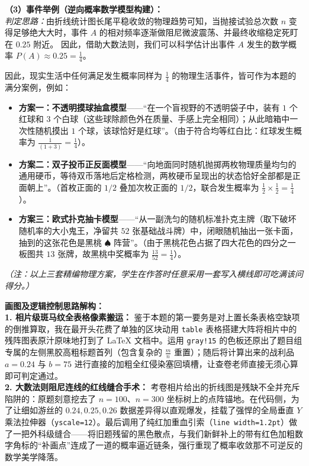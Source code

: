 \vspace{0.4cm}
\textbf{（3）事件举例（逆向概率数学模型构建）：} \\
\textit{判定思路：}由折线统计图长尾平稳收敛的物理趋势可知，当抛接试验总次数 $n$ 变得足够绝大大时，事件 $A$ 的相对频率逐渐做阻尼微波震荡、并最终收缩稳定死盯在 $0.25$ 附近。
因此，借助大数法则，我们可以科学估计出事件 $A$ 发生的数学概率 $P(A) \approx 0.25 = \frac{1}{4}$。

因此，现实生活中任何满足发生概率同样为 $\frac{1}{4}$ 的物理生活事件，皆可作为本题的满分案例，例如：
\begin{itemize}
    \item \textbf{方案一：不透明摸球抽盒模型}——“在一个盲视野的不透明袋子中，装有 $1$ 个红球和 $3$ 个白球（这些球除颜色外在质量、手感上完全相同）；从此暗箱中一次性随机摸出 $1$ 个球，该球恰好是红球”。（由于符合均等红白比：红球发生概率为 $\frac{1}{(1+3)} = \frac{1}{4}$）。
    \item \textbf{方案二：双子投币正反面模型}——“向地面同时随机抛掷两枚物理质量均匀的通用硬币，等待双币落地后定格检测，两枚硬币呈现出的状态恰好全部都是正面朝上”。（首枚正面的 $1/2$ 叠加次枚正面的 $1/2$，联合发生概率为 $\frac{1}{2} \times \frac{1}{2} = \frac{1}{4}$）。
    \item \textbf{方案三：欧式扑克抽卡模型}——“从一副洗匀的随机标准扑克主牌（取下破坏随机率的大小鬼王，净留共 $52$ 张基础战斗牌）中，闭眼随机抽出一张卡面，抽到的这张花色是黑桃 $\spadesuit$ 阵营”。（由于黑桃花色占据了四大花色的四分之一板图共 $13$ 张牌，故黑桃中奖概率为 $\frac{13}{52} = \frac{1}{4}$）。
\end{itemize}
\textit{（注：以上三套精编物理方案，学生在作答时任意采用一套写入横线即可吃满该问得分。）}

\vspace{0.4cm}
{\small\color{blue!70!black}
\textbf{画图及逻辑控制思路解构：}\\
\textbf{1. 相片级斑马纹全表格像素搬运：} 鉴于本题的第一要务是对上置长条表格空缺项的倒推算取，我在最开头花费了单独的区块动用 \texttt{table} 表格搭建大阵将相片中的残阵图表原汁原味地打到了 LaTeX 文档中。运用 \texttt{gray!15} 的色板还原出了题目组专属的左侧黑胶高粗标题首列（包含复杂的 $\frac{m}{n}$ 重置）；随后将计算出来的战利品 $a=0.24$ 与 $b=75$ 进行直接的加粗全红侵染塞回填槽，让查卷老师直接无须心算即可判定通过。\\
\textbf{2. 大数法则阻尼连线的红线缝合手术：} 考卷相片给出的折线图是残缺不全并充斥陷阱的：原题刻意挖去了 $n=100$、$n=300$ 坐标树上的点阵锚地。在代码侧，为了让细如游丝的 $0.24, 0.25, 0.26$ 数据差异得以直观爆发，挂载了强悍的全局垂直 $Y$ 乘法拉伸器（\texttt{yscale=12}）。最后调用了纯红加重血引索（\texttt{line width=1.2pt}）做了一把外科级缝合——将旧题残留的黑色散点，与我们新鲜补上的带有红色加粗数字角标的“补画点”连成了一道的概率逼近链条，强行重现了概率收敛那不可逆反的数学美学降落。
}

